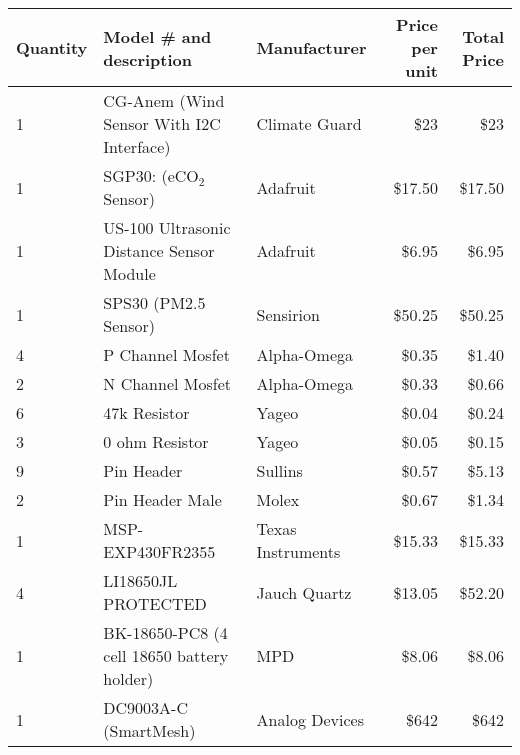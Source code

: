 \begin{table}[htbp]
  \centering
  \small
  \renewcommand{\arraystretch}{1.2}
  \begin{adjustbox}{max width=\textwidth}
      \begin{tabular}{|l|l|l|r|r|}
        \hline
        Quantity & Model \# and description & Manufacturer & Price per unit & Total Price \\ 
        \hline
        1 & CG-Anem (Wind Sensor With I2C Interface) & Climate Guard & \$23 & \$23 \\ 
        \hline
        1 & SGP30: (eCO$_2$ Sensor) & Adafruit & \$17.50 & \$17.50 \\ 
        \hline
        1 & US-100 Ultrasonic Distance Sensor Module & Adafruit & \$6.95 & \$6.95 \\ 
        \hline
        1 & SPS30 (PM2.5 Sensor)  & Sensirion & \$50.25 & \$50.25 \\ 
        \hline
        4 & P Channel Mosfet & Alpha-Omega & \$0.35 & \$1.40 \\ 
        \hline
        2 & N Channel Mosfet & Alpha-Omega & \$0.33 & \$0.66 \\ 
        \hline
        6 & 47k Resistor & Yageo & \$0.04 & \$0.24 \\ 
        \hline
        3 & 0 ohm Resistor & Yageo & \$0.05 & \$0.15 \\ 
        \hline
        9 & Pin Header & Sullins & \$0.57 & \$5.13 \\ 
        \hline
        2 & Pin Header Male & Molex & \$0.67 & \$1.34 \\ 
        \hline
        1 & MSP-EXP430FR2355 & Texas Instruments & \$15.33 & \$15.33 \\ 
        \hline
        4 & LI18650JL PROTECTED & Jauch Quartz & \$13.05 & \$52.20 \\ 
        \hline
        1 & BK-18650-PC8 (4 cell 18650 battery holder) & MPD & \$8.06 & \$8.06 \\ 
        \hline
        1 & DC9003A-C (SmartMesh) & Analog Devices & \$642 & \$642 \\ 
        \hline
      \end{tabular}
  \end{adjustbox}
\end{table}

